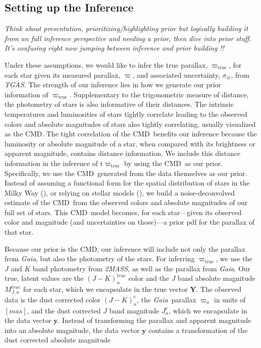 \documentclass[modern]{aastex61}
\newcommand{\acronym}[1]{{\small{#1}}}
\newcommand{\project}[1]{\textsl{#1}}
\newcommand{\tgas}{\project{\acronym{TGAS}}}
\newcommand{\tmass}{\project{\acronym{2MASS}}}
\newcommand{\gaia}{\project{Gaia}}
\newcommand{\cmd}{\acronym{CMD}}
\newcommand{\true}{\mathrm{true}}
\begin{document}
\subsection{Setting up the Inference}
 \emph{Think about presentation, prioritizing/highlighting prior but logically building it from an full inference perspective and needing a prior, then dive into prior stuff. It's confusing right now jumping between inference and prior building !!}

Under these assumptions, we would like to infer the true parallax, $\varpi_{\true}$, for each star given its measured parallax, $\varpi$, and associated uncertainty, $\sigma_{\varpi}$, from \tgas.
The strength of our inference lies in how we generate our prior information of $\varpi_{\true}$.
Supplementary to the trigonometric measure of distance, the photometry of stars is also informative of their distances.
The intrinsic temperatures and luminosities of stars tightly correlate leading to the observed colors and absolute magnitudes of stars also tightly correlating, usually visualized as the \cmd.
The tight correlation of the \cmd\ benefits our inference because the luminosity or absolute magnitude of a star, when compared with its brightness or apparent magnitude, contains distance information.
We include this distance information in the inference of t$\varpi_{\true}$ by using the \cmd\ as our prior.
Specifically, we use the \cmd\ generated from the data themselves as our prior.
Instead of assuming a functional form for the spatial distribution of stars in the Milky Way (\citealt{astraatmadja16b}), or relying on stellar models (\citealt{gaia16}), we build a noise-deconvolved estimate of the \cmd\ from the observed colors and absolute magnitudes of our full set of stars.
This \cmd\ model becomes, for each star---given its observed color and magnitude (and uncertainties on those)---a prior pdf for the parallax of that star.

Because our prior is the \cmd, our inference will include not only the parallax from \gaia, but also the photometry of the stars. For inferring $\varpi_{\true}$, we use the $J$ and $K$ band photometry from \tmass, as well as the parallax from \gaia. Our true, latent values are the $(J-K)^{true}_n$ color and the $J$ band absolute magnitude $M^{true}_{J,n}$ for each star, which we encapsulate in the true vector $\mathbf{Y}$. The observed data is the dust corrected color $(J-K)^c_n$, the \gaia\ parallax $\varpi_n$ in units of $[mas]$, and the dust corrected $J$ band magnitude $J^c_n$, which we encapsulate in the data vector $\mathbf{y}$. Instead of transforming the parallax and apparent magnitude into an absolute magnitude, the data vector $\mathbf{y}$ contains a transformation of the dust corrected absolute magnitude
\end{document}

